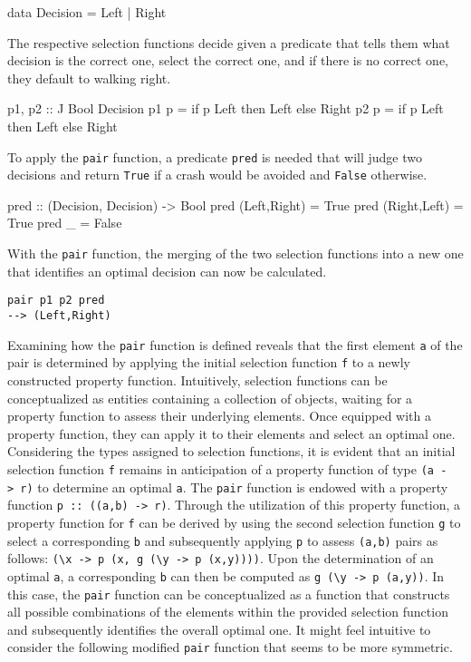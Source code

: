 \documentclass[runningheads]{llncs}
\begin{document}
\begin{code}
data Decision = Left | Right
\end{code}

The respective selection functions decide given a predicate that tells
them what decision is the correct one, select the correct one, and if
there is no correct one, they default to walking right.

\begin{code}
p1, p2 :: J Bool Decision
p1 p = if p Left then Left else Right
p2 p = if p Left then Left else Right
\end{code}

To apply the \texttt{pair} function, a predicate \texttt{pred} is needed
that will judge two decisions and return \texttt{True} if a crash would
be avoided and \texttt{False} otherwise.

\begin{code}
pred :: (Decision, Decision) -> Bool
pred (Left,Right) = True
pred (Right,Left) = True
pred _            = False
\end{code}

With the \texttt{pair} function, the merging of the two selection
functions into a new one that identifies an optimal decision can now be
calculated.

\begin{verbatim}
pair p1 p2 pred
--> (Left,Right)
\end{verbatim}

Examining how the \texttt{pair} function is defined reveals that the
first element \texttt{a} of the pair is determined by applying the
initial selection function \texttt{f} to a newly constructed property
function. Intuitively, selection functions can be conceptualized as
entities containing a collection of objects, waiting for a property
function to assess their underlying elements. Once equipped with a
property function, they can apply it to their elements and select an
optimal one. Considering the types assigned to selection functions, it
is evident that an initial selection function \texttt{f} remains in
anticipation of a property function of type
\texttt{(a\ -\textgreater{}\ r)} to determine an optimal \texttt{a}. The
\texttt{pair} function is endowed with a property function
\texttt{p\ ::\ ((a,b)\ -\textgreater{}\ r)}. Through the utilization of
this property function, a property function for \texttt{f} can be
derived by using the second selection function \texttt{g} to select a
corresponding \texttt{b} and subsequently applying \texttt{p} to assess
\texttt{(a,b)} pairs as follows:
\texttt{(\textbackslash{}x\ -\textgreater{}\ p\ (x,\ g\ (\textbackslash{}y\ -\textgreater{}\ p\ (x,y))))}.
Upon the determination of an optimal \texttt{a}, a corresponding
\texttt{b} can then be computed as
\texttt{g\ (\textbackslash{}y\ -\textgreater{}\ p\ (a,y))}. In this
case, the \texttt{pair} function can be conceptualized as a function
that constructs all possible combinations of the elements within the
provided selection function and subsequently identifies the overall
optimal one. It might feel intuitive to consider the following modified
\texttt{pair} function that seems to be more symmetric.
\end{document}
